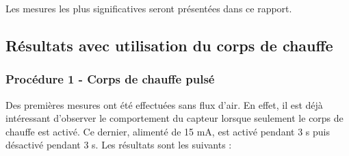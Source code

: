Les mesures les plus significatives seront présentées dans ce rapport. \\

\subsection{Résultats avec utilisation du corps de chauffe}
\subsubsection{Procédure 1 - Corps de chauffe pulsé}
Des premières mesures ont été effectuées sans flux d'air. En effet, il est déjà intéressant d'observer le comportement du capteur
lorsque seulement le corps de chauffe est activé. Ce dernier, alimenté de 15 mA, est activé pendant 3 s puis désactivé pendant 3 s. 
Les résultats sont les suivants :

